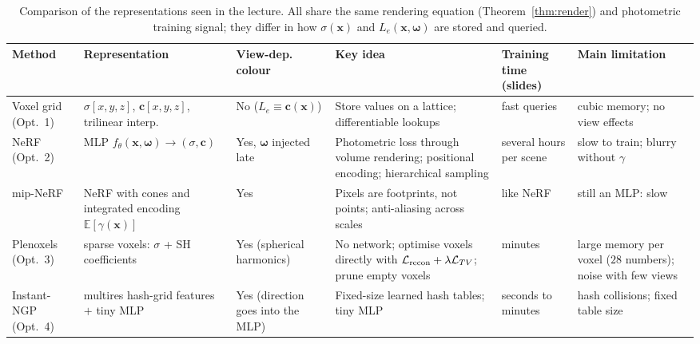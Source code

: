 \documentclass[11pt,a4paper]{article}
\newcommand{\E}{\mathbb{E}}
\newcommand{\om}{\boldsymbol{\omega}}
\newcommand{\cc}{\boldsymbol{c}}
\newcommand{\xx}{\boldsymbol{x}}
\newcommand{\Le}{L_e}
\theoremstyle{definition}
\theoremstyle{plain}
\theoremstyle{remark}
\begin{document}
\begin{table}[htbp]
\centering
\footnotesize
\setlength{\tabcolsep}{3pt}
\renewcommand{\arraystretch}{1.25}
\begin{tabular}{@{}>{\raggedright\arraybackslash}p{1.9cm}>{\raggedright\arraybackslash}p{2.9cm}>{\raggedright\arraybackslash}p{2.0cm}>{\raggedright\arraybackslash}p{3.3cm}>{\raggedright\arraybackslash}p{2.0cm}>{\raggedright\arraybackslash}p{2.7cm}@{}}
\toprule
\textbf{Method} & \textbf{Representation} & \textbf{View-dep. colour} & \textbf{Key idea} & \textbf{Training time (slides)} & \textbf{Main limitation}\\
\midrule
Voxel grid (Opt.~1) & $\sigma[x,y,z]$, $\cc[x,y,z]$, trilinear interp. & No ($\Le\equiv\cc(\xx)$) & Store values on a lattice; differentiable lookups & fast queries & cubic memory; no view effects\\
\addlinespace
NeRF (Opt.~2) & MLP $f_\theta(\xx,\om)\to(\sigma,\cc)$ & Yes, $\om$ injected late & Photometric loss through volume rendering; positional encoding; hierarchical sampling & several hours per scene & slow to train; blurry without $\gamma$\\
\addlinespace
mip-NeRF & NeRF with cones and integrated encoding $\E[\gamma(\xx)]$ & Yes & Pixels are footprints, not points; anti-aliasing across scales & like NeRF & still an MLP: slow\\
\addlinespace
Plenoxels (Opt.~3) & sparse voxels: $\sigma$ + SH coefficients & Yes (spherical harmonics) & No network; optimise voxels directly with $\mathcal L_{\rm recon}+\lambda\mathcal L_{TV}$; prune empty voxels & minutes & large memory per voxel ($28$ numbers); noise with few views\\
\addlinespace
Instant-NGP (Opt.~4) & multires hash-grid features $+$ tiny MLP & Yes (direction goes into the MLP) & Fixed-size learned hash tables; tiny MLP & seconds to minutes & hash collisions; fixed table size\\
\bottomrule
\end{tabular}
\caption{Comparison of the representations seen in the lecture. All share the same rendering equation (Theorem~\ref{thm:render}) and photometric training signal; they differ in how $\sigma(\xx)$ and $\Le(\xx,\om)$ are stored and queried.}
\end{table}
\end{document}
